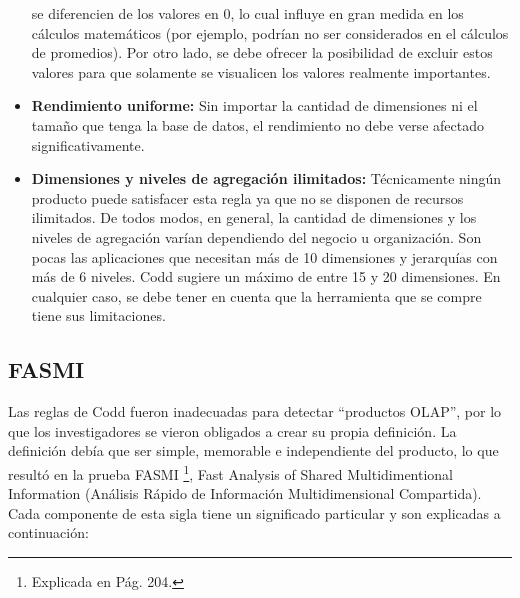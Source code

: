 \documentclass[a4paper,11pt]{article}
\begin{document}
\begin{itemize}
      se diferencien de los valores en 0, lo cual influye en gran medida en los cálculos matemáticos (por ejemplo, podrían no ser considerados en el cálculos
      de promedios). Por otro lado, se debe ofrecer la posibilidad de excluir estos valores para que solamente se visualicen los valores realmente
      importantes.
      \item \textbf{Rendimiento uniforme:} Sin importar la cantidad de dimensiones ni el tamaño que tenga la base de datos, el rendimiento no debe verse
      afectado significativamente.
      \item \textbf{Dimensiones y niveles de agregación ilimitados:} Técnicamente ningún producto puede satisfacer esta regla ya que no se disponen de
      recursos ilimitados. De todos modos, en general, la cantidad de dimensiones y los niveles de agregación varían dependiendo del negocio u organización.
      Son pocas las aplicaciones que necesitan más de 10 dimensiones y jerarquías con más de 6 niveles. Codd sugiere un máximo de entre 15 y 20 dimensiones.
      En cualquier caso, se debe tener en cuenta que la herramienta que se compre tiene sus limitaciones.
    \end{itemize}
    
    
    \subsection{FASMI}
    
    Las reglas de Codd fueron inadecuadas para detectar ``productos OLAP'', por lo que los investigadores se vieron obligados a crear su propia
    definición. La definición debía que ser simple, memorable e independiente del producto, lo que resultó en la prueba FASMI \footnote{Explicada en
    \cite{nagabhushana} Pág. 204.}, Fast Analysis of Shared Multidimentional Information (Análisis Rápido de Información 
    Multidimensional Compartida). Cada componente de esta sigla tiene un significado particular y son explicadas a continuación:
    
\end{document}
